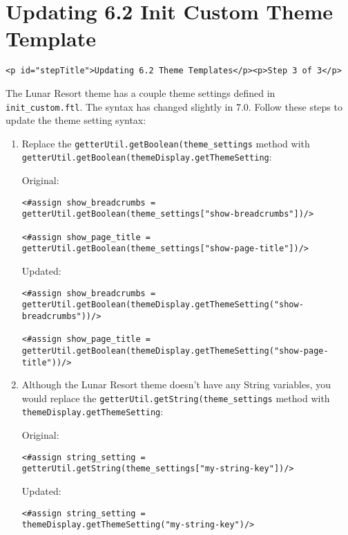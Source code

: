 \chapter{Updating 6.2 Init Custom Theme
Template}\label{updating-6.2-init-custom-theme-template}

\begin{verbatim}
<p id="stepTitle">Updating 6.2 Theme Templates</p><p>Step 3 of 3</p>
\end{verbatim}

The Lunar Resort theme has a couple theme settings defined in
\texttt{init\_custom.ftl}. The syntax has changed slightly in 7.0.
Follow these steps to update the theme setting syntax:

\begin{enumerate}
\def\labelenumi{\arabic{enumi}.}
\item
  Replace the \texttt{getterUtil.getBoolean(theme\_settings} method with
  \texttt{getterUtil.getBoolean(themeDisplay.getThemeSetting}:

  Original:

\begin{verbatim}
<#assign show_breadcrumbs = 
getterUtil.getBoolean(theme_settings["show-breadcrumbs"])/>

<#assign show_page_title = 
getterUtil.getBoolean(theme_settings["show-page-title"])/>
\end{verbatim}

  Updated:

\begin{verbatim}
<#assign show_breadcrumbs = 
getterUtil.getBoolean(themeDisplay.getThemeSetting("show-breadcrumbs"))/>

<#assign show_page_title = 
getterUtil.getBoolean(themeDisplay.getThemeSetting("show-page-title"))/>
\end{verbatim}
\item
  Although the Lunar Resort theme doesn't have any String variables, you
  would replace the \texttt{getterUtil.getString(theme\_settings} method
  with \texttt{themeDisplay.getThemeSetting}:

  Original:

\begin{verbatim}
<#assign string_setting = 
getterUtil.getString(theme_settings["my-string-key"])/>
\end{verbatim}

  Updated:

\begin{verbatim}
<#assign string_setting = 
themeDisplay.getThemeSetting("my-string-key")/>
\end{verbatim}
\end{enumerate}

